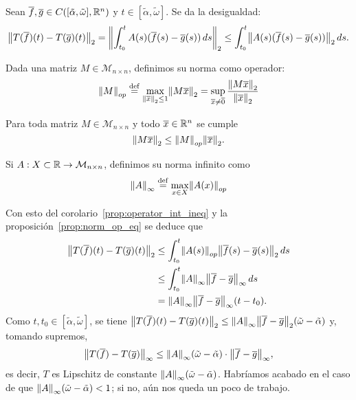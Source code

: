 \documentclass[../ecuaciones_diferenciales.tex]{subfiles}
\begin{document}
\begin{corollary} \label{prop:operator_int_ineq}
	Sean \(\overline{f}, \overline{g} \in C([\tilde{\alpha}, \tilde{\omega}], \mathbb{R}^n)\) y 
	\(t \in [\tilde{\alpha}, \tilde{\omega}]\). Se da la desigualdad:
	\[\norm{T(\vec{f})(t) - T(\vec{g})(t)}_2 
		= \norm{\int_{t_0}^t A(s)(\vec{f}(s) - \vec{g}(s)) \dif s}_2 
		\leq \int_{t_0}^t \norm{A(s)(\vec{f}(s) - \vec{g}(s))}_2 \dif s.\]
\end{corollary}

\begin{definition}
	Dada una matriz \(M \in \mathcal{M}_{n \times n}\), definimos su norma 
	como operador:
	\[\norm{M}_{op} \assign \max_{\norm{\vec{x}}_2 \leq 1} \norm{M \vec{x}}_2 
		= \sup_{\vec{x} \neq \vec{0}}
			\frac{\norm{M \vec{x}}_2}{\norm{\vec{x}}_2}\]
\end{definition}

\begin{proposition} \label{prop:norm_op_eq}
	Para toda matriz \(M \in \mathcal{M}_{n \times n}\) y todo 
	\(\overline{x} \in \mathbb{R}^n\) se cumple 
	\[\norm{M \vec{x}}_2 \leq \norm{M}_{op} \norm{\vec{x}}_2.\]
\end{proposition}

\begin{definition}
	Si \(A : X \subset \mathbb{R} \to \mathcal{M}_{n \times n}\), definimos su norma 
	infinito como
	\[\norm{A}_\infty \assign \max_{x \in X} \norm{A(x)}_{op}\]
\end{definition}

Con esto del corolario~\ref{prop:operator_int_ineq} y la 
proposición~\ref{prop:norm_op_eq} se deduce que
\begin{align*}
	\norm{T(\vec{f})(t) - T(\vec{g})(t)}_2 
	&\leq \int_{t_0}^t \norm{A(s)}_{op} \norm{\vec{f}(s) - \vec{g}(s)}_2 \dif s
	\\
	&\leq \int_{t_0}^t \norm{A}_\infty \norm{\vec{f} - \vec{g}}_\infty \dif s \\
	&= \norm{A}_\infty\norm{\vec{f} - \vec{g}}_\infty(t - t_0).
\end{align*}
Como \(t, t_0 \in [\tilde{\alpha}, \tilde{\omega}]\), se tiene
\(\norm{T(\vec{f})(t) - T(\vec{g})(t)}_2 
	\leq \norm{A}_\infty\norm{\vec{f} - \vec{g}}_2 
		(\tilde{\omega} - \tilde{\alpha})\) y, tomando supremos, 
\[\norm{T(\vec{f}) - T(\vec{g})}_\infty 
	\leq \norm{A}_\infty(\tilde{\omega} 
	- \tilde{\alpha}) \cdot \norm{\vec{f} - \vec{g}}_\infty,\]
es decir, \(T\) es Lipschitz de
constante \(\norm{A}_\infty(\tilde{\omega}-\tilde{\alpha})\). Habríamos
acabado en el caso de que 
\(\norm{A}_\infty(\tilde{\omega}-\tilde{\alpha}) < 1\); si no, aún nos queda un
poco de trabajo.
\end{document}
